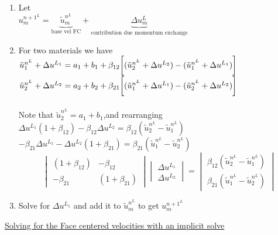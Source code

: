 \documentclass[fleqn]{article}
\newcommand{\B}[1]   {\biggr{#1}}
\begin{document}
\begin{enumerate}
\item Let \\
$u^{n+1^{L}}_m = \underbrace{\tilde u^{n^{L}}_m}_{\text{base vel FC}} 
+ \underbrace{\Delta{u^{L}_m}}_{\text{contribution due momentum exchange}}$
\item  For two materials we have\\
$
    \tilde u^{n^{L}}_1 + \Delta{u^{L_1}} = a_1 + b_1 + 
    \beta_{12}\B[(\tilde u^{n^{L}}_2 + \Delta{u^{L_2}}) - (\tilde u^{n^{L}}_1 + \Delta{u^{L_1}}) \B]
$\\
$
    \tilde u^{n^{L}}_2 + \Delta{u^{L_2}} = a_2 + b_2 + 
    \beta_{21}\B[(\tilde u^{n^{L}}_1 + \Delta{u^{L_1}}) - (\tilde u^{n^{L}}_2 + \Delta{u^{L_2}}) \B]
$\\
\\
Note that $\tilde u^{n^{L}}_2 = a_1 + b_1$,and rearranging\\
$
\Delta{u^{L_1}}(1 + \beta_{12}) - \beta_{12}\Delta{u^{L_2}} = \beta_{12}(\tilde u^{n^{L}}_2 - \tilde u^{n^{L}}_1)
$\\
$
-\beta_{21}\Delta{u^{L_1}} - \Delta{u^{L_2}}(1 + \beta_{21}) = \beta_{21}(\tilde u^{n^{L}}_1 - \tilde u^{n^{L}}_2)
$
\[ \begin{vmatrix} (1 + \beta_{12})  &  -\beta_{12} \\
                  -\beta_{21}       &  (1 + \beta_{21})
    \end{vmatrix}
    \begin{vmatrix} \Delta{u^{L_1}} \\
                    \Delta{u^{L_2}}
    \end{vmatrix}
    =
    \begin{vmatrix} \beta_{12}(\tilde u^{n^{L}}_2 - \tilde u^{n^{L}}_1) \\
                    \beta_{21}(\tilde u^{n^{L}}_1 - \tilde u^{n^{L}}_2)
    \end{vmatrix}                
\]
\item Solve for $\Delta{u^{L_1}}$ and add it to $\tilde u^{n^{L}}_m$ to get $u^{n+1^{L}}_m $
\end{enumerate}


\newpage
\underline{Solving for the Face centered velocities with an implicit solve}
\end{document}
